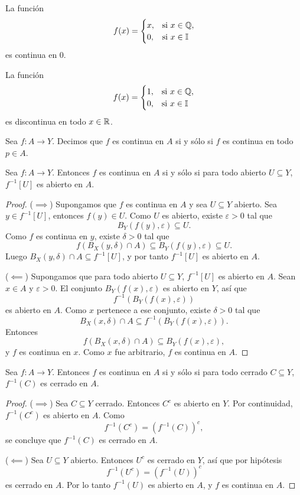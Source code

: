 \begin{example}
La función
\[
f(x)=\begin{cases}
x, & \text{si } x\in\mathbb{Q},\\
0, & \text{si } x\in\mathbb{I}
\end{cases}
\]
es continua en $0$.
\end{example}

\begin{example}
La función
\[
f(x)=\begin{cases}
1, & \text{si } x\in\mathbb{Q},\\
0, & \text{si } x\in\mathbb{I}
\end{cases}
\]
es discontinua en todo $x\in\mathbb{R}$.
\end{example}

\begin{definicion}
Sea $f:A\to Y$. Decimos que $f$ es continua en $A$ si y sólo si $f$ es continua en todo $p\in A$.
\end{definicion}

\begin{teorema}
Sea $f:A\to Y$. Entonces $f$ es continua en $A$ si y sólo si para todo abierto $U\subseteq Y$, $f^{-1}[U]$ es abierto en $A$.
\end{teorema}

\begin{proof}
($\implies$) Supongamos que $f$ es continua en $A$ y sea $U\subseteq Y$ abierto.
Sea $y\in f^{-1}[U]$, entonces $f(y)\in U$. Como $U$ es abierto, existe $\varepsilon>0$ tal que
\[
B_Y(f(y),\varepsilon)\subseteq U.
\]
Como $f$ es continua en $y$, existe $\delta>0$ tal que
\[
f(B_X(y,\delta)\cap A)\subseteq B_Y(f(y),\varepsilon)\subseteq U.
\]
Luego $B_X(y,\delta)\cap A\subseteq f^{-1}[U]$, y por tanto $f^{-1}[U]$ es abierto en $A$.

($\impliedby$) Supongamos que para todo abierto $U\subseteq Y$, $f^{-1}[U]$ es abierto en $A$.
Sean $x\in A$ y $\varepsilon>0$. El conjunto $B_Y(f(x),\varepsilon)$ es abierto en $Y$, así que
\[
f^{-1}(B_Y(f(x),\varepsilon))
\]
es abierto en $A$. Como $x$ pertenece a ese conjunto, existe $\delta>0$ tal que
\[
B_X(x,\delta)\cap A\subseteq f^{-1}(B_Y(f(x),\varepsilon)).
\]
Entonces
\[
f(B_X(x,\delta)\cap A)\subseteq B_Y(f(x),\varepsilon),
\]
y $f$ es continua en $x$. Como $x$ fue arbitrario, $f$ es continua en $A$.
\end{proof}

\begin{teorema}
Sea $f:A\to Y$. Entonces $f$ es continua en $A$ si y sólo si para todo cerrado $C\subseteq Y$, $f^{-1}(C)$ es cerrado en $A$.
\end{teorema}

\begin{proof}
($\implies$) Sea $C\subseteq Y$ cerrado. Entonces $C^c$ es abierto en $Y$. Por continuidad, $f^{-1}(C^c)$ es abierto en $A$.
Como
\[
f^{-1}(C^c)=(f^{-1}(C))^c,
\]
se concluye que $f^{-1}(C)$ es cerrado en $A$.

($\impliedby$) Sea $U\subseteq Y$ abierto. Entonces $U^c$ es cerrado en $Y$, así que por hipótesis
\[
f^{-1}(U^c)=(f^{-1}(U))^c
\]
es cerrado en $A$. Por lo tanto $f^{-1}(U)$ es abierto en $A$, y $f$ es continua en $A$.
\end{proof}

